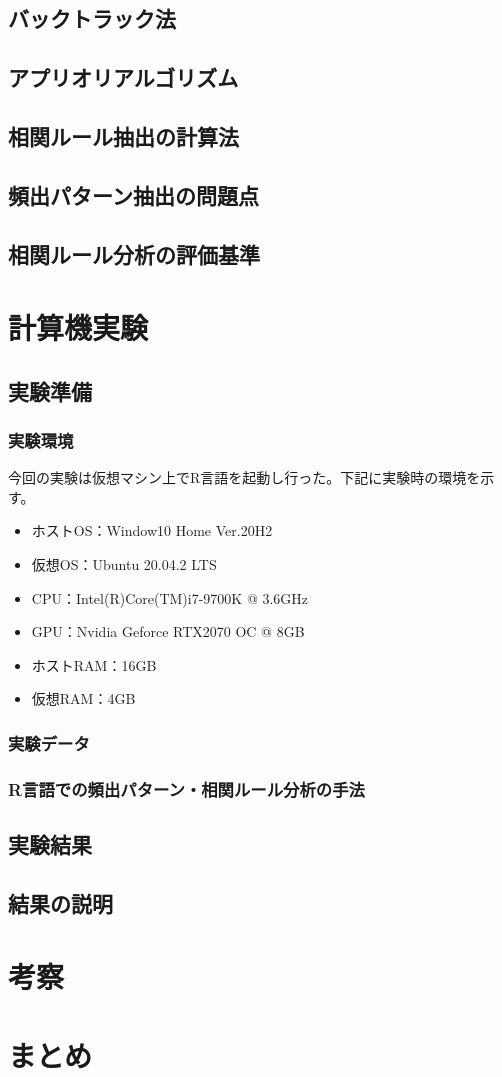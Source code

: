 \documentclass[dvipdfmx]{jsarticle}
\begin{document}
\subsection{バックトラック法}
\subsection{アプリオリアルゴリズム}
\subsection{相関ルール抽出の計算法}
\subsection{頻出パターン抽出の問題点}
\subsection{相関ルール分析の評価基準}

\section{計算機実験}
\subsection{実験準備}
  \subsubsection{実験環境}
  今回の実験は仮想マシン上でR言語を起動し行った。下記に実験時の環境を示す。
  \begin{itemize}
    \item ホストOS：Window10 Home Ver.20H2
    \item 仮想OS：Ubuntu 20.04.2 LTS
    \item CPU：Intel(R)Core(TM)i7-9700K @ 3.6GHz
    \item GPU：Nvidia Geforce RTX2070 OC @ 8GB
    \item ホストRAM：16GB
    \item 仮想RAM：4GB
  \end{itemize}
\subsubsection{実験データ}
\subsubsection{R言語での頻出パターン・相関ルール分析の手法}
\subsection{実験結果}
\subsection{結果の説明}

\section{考察}
\section{まとめ}

\begin{thebibliography}{99}
\end{thebibliography}
\end{document}
